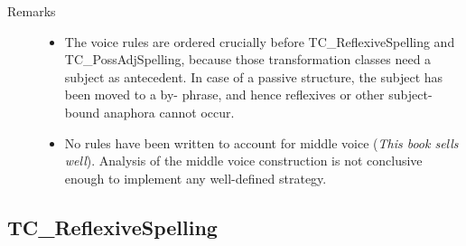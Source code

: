 \begin{description}
\vspace{1 cm}
\item[Remarks] \mbox{}
  \begin{itemize}
  \item The voice rules are ordered crucially before TC\_ReflexiveSpelling and 
TC\_\-PossAdjSpelling, because those transformation classes need a subject as 
antecedent. In case of a passive structure, the subject has been moved to a by-
phrase, and hence reflexives or other subject-bound anaphora cannot occur.
  \item No rules have been written to account for middle voice ({\em This book 
sells well\/}). Analysis of the middle voice construction is not conclusive 
enough to implement any well-defined strategy.
  \end{itemize}
\end{description}

\newpage
\subsection{TC\_ReflexiveSpelling}

